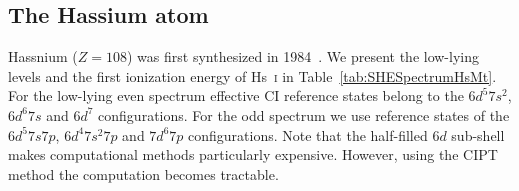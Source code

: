 \documentclass[10pt,a4paper, twoside, openright]{report}
\begin{document}
\subsection{The Hassium atom} \label{sec:Hs}

Hassnium ($Z=108$) was first synthesized in 1984~\cite{Munzenberg1984}. We present the low-lying levels and the first ionization energy of Hs~\textsc{i} in Table~\ref{tab:SHESpectrumHsMt}. For the low-lying even spectrum effective CI reference states belong to the $6d^5 7s^2$, $6d^6 7s$ and $6d^7$ configurations. For the odd spectrum we use reference states of the $6d^5 7s 7p$, $6d^4 7s^2 7p$ and $7d^6 7p$ configurations.  Note that the half-filled $6d$ sub-shell makes computational methods particularly expensive. However, using the CIPT method the computation becomes tractable.  
\end{document}
